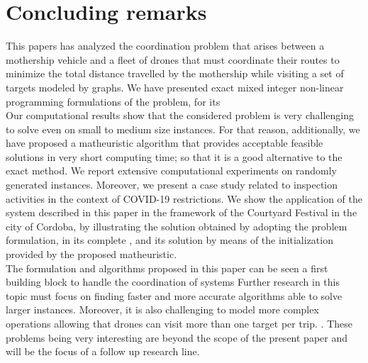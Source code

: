 \section{Concluding remarks\label{section:CR}}
\noindent
This papers has analyzed the coordination problem that arises between a mothership vehicle and a fleet of drones that must coordinate their routes to minimize the total distance travelled by the mothership while visiting a set of targets modeled by graphs. We have presented exact mixed integer non-linear programming formulations of the problem, for its \\
Our computational results show that the considered problem is very challenging to solve even on small to medium size instances. For that reason, additionally, we have proposed a matheuristic algorithm that provides acceptable feasible solutions in very short computing time; so that it is a good alternative to the exact method. We report extensive computational experiments on randomly generated instances. Moreover, we present a case study related to inspection activities in the context of COVID-19 restrictions. We show the application of the system described in this paper in the framework of the Courtyard Festival in the city of Cordoba, by illustrating the solution obtained by adopting the problem formulation, in its complete , and its solution by means of the initialization provided by the proposed matheuristic.\\
\noindent
The formulation and algorithms proposed in this paper can be seen  a first building block to handle the coordination of systems  Further research in this topic must focus on finding faster and more accurate algorithms able to solve larger instances. Moreover, it is also challenging to model more complex operations allowing that drones can visit more than one target per trip. . These problems being very interesting are beyond the scope of the present paper and will be the focus of a follow up research line.